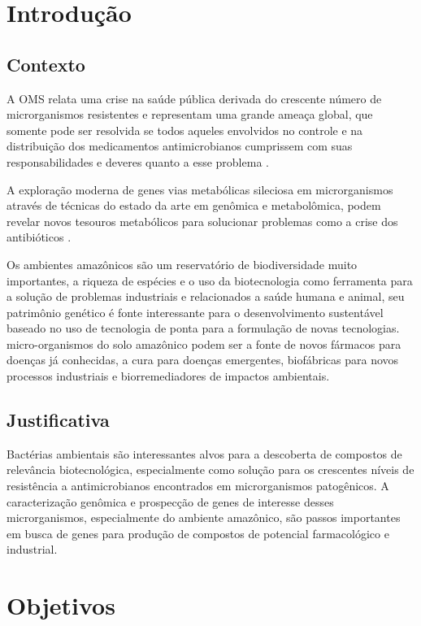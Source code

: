 \chapter{Introdução}
\label{cap:introducao}

\section{Contexto}

A OMS relata uma crise na saúde pública derivada do crescente número
de microrganismos resistentes e representam uma grande ameaça global, que somente
pode ser resolvida se todos aqueles envolvidos no controle e na distribuição
dos medicamentos antimicrobianos cumprissem com suas responsabilidades e deveres 
quanto a esse problema \cite{talebi2019world}.

A exploração moderna de genes vias metabólicas sileciosa em microrganismos
através de técnicas do estado da arte em genômica e metabolômica, podem
revelar novos tesouros metabólicos para solucionar problemas como a crise
dos antibióticos \cite{zhang2021glossary}.

Os ambientes amazônicos são um reservatório de biodiversidade muito importantes,
a riqueza de espécies e o uso da biotecnologia como ferramenta para a solução de problemas industriais  e relacionados
a saúde humana e animal, seu patrimônio genético é fonte interessante para o
desenvolvimento sustentável baseado no uso de tecnologia de ponta para a formulação de novas tecnologias.
micro-organismos do solo amazônico podem ser a fonte de novos fármacos para doenças já conhecidas,
a cura para doenças emergentes, biofábricas para novos processos industriais e biorremediadores
de impactos ambientais.

\section{Justificativa}
Bactérias ambientais são interessantes alvos para a descoberta de compostos
de relevância biotecnológica, especialmente como solução para os crescentes níveis
de resistência a antimicrobianos encontrados em microrganismos patogênicos.
A caracterização genômica e prospecção de genes de interesse desses microrganismos,
especialmente do ambiente amazônico, são passos importantes
em busca de genes para produção de compostos de potencial farmacológico e industrial.

\chapter{Objetivos}

